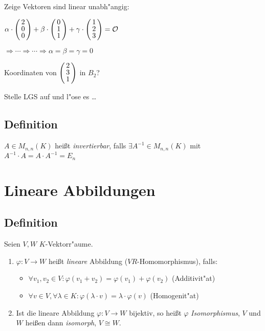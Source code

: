 \begin{enumerate}
	 Zeige Vektoren sind linear unabh"angig:
	 
	 $\alpha \cdot \vct{2 \\ 0 \\ 0} + \beta \cdot \vct{0 \\  1\\ 1} + \gamma \cdot \vct{1 \\ 2 \\ 3} = \zerovec$
	 
	 $\Rightarrow  \cdots  \Rightarrow \cdots \Rightarrow \alpha = \beta = \gamma = 0$
	 
	 Koordinaten von $\vct{2 \\ 3 \\ 1}$ in $B_2$?
	 
	 Stelle LGS auf und l"ose es \dots
	 \end{enumerate}
	 \subsection{Definition}
	 
	 $A \in M_{n,n}(K)$ heißt \emph{invertierbar}, falls $\exists  A^{-1} \in M_{n,n}(K)$ mit $A^{-1} \cdot A = A \cdot A^{-1} = E_n$
	 
\section{Lineare Abbildungen}
\subsection{Definition}

Seien $V,W$ $K$-Vektorr"aume.
\begin{enumerate}
	\item
	$\varphi: V \rightarrow W$ heißt \emph{lineare} Abbildung ($VR$-Homomorphismus), falls:
	\begin{itemize}
		\item
		$\forall v_1, v_2 \in V: \varphi(v_1+v_2) = \varphi(v_1) + \varphi(v_2)$ (Additivit"at)
		\item
		$\forall v \in V, \forall \lambda \in K: \varphi(\lambda \cdot v) = \lambda \cdot \varphi(v)$ (Homogenit"at)
	\end{itemize}
	\item
	Ist die lineare Abbildung $\varphi: V \rightarrow W$ bijektiv, so heißt $\varphi$ \emph{Isomorphismus}, $V$ und $W$ heißen dann \emph{isomorph}, $V \cong W$.
\end{enumerate}
